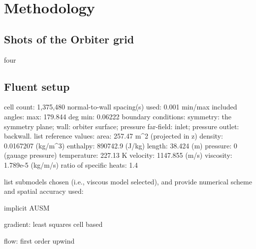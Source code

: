 \section{Methodology}

\subsection{Shots of the Orbiter grid}

four

\subsection{Fluent setup}

cell count: 1,375,480
normal-to-wall spacing(s) used: 0.001
min/max included angles: max: 179.844 deg min: 0.06222
boundary conditions: symmetry: the symmetry plane; wall: orbiter surface; pressure far-field: inlet; pressure outlet: backwall.
list reference values:
area: 257.47 m^2 (projected in z)
density: 0.0167207 (kg/m^3)
enthalpy: 890742.9 (J/kg)
length: 38.424 (m)
pressure: 0 (gauage pressure)
temperature: 227.13 K
velocity: 1147.855 (m/s)
viscosity: 1.789e-5 (kg/m/s)
ratio of specific heats: 1.4

list submodels chosen (i.e., viscous model selected), and provide numerical scheme and spatial accuracy used:

implicit AUSM

gradient: least squares cell based

flow: first order upwind